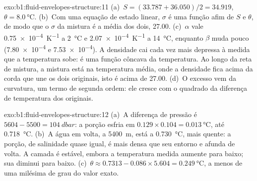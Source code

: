 \begin{solution}{exo:b1:fluid-envelopes-structure:11}
(a)~$S = (33.787 + 36.050)/2 = 34.919$, $\theta = \qty{8.0}{\celsius}$.
(b)~Com uma equação de estado linear, $\sigma$ é uma função afim de $S$ e
$\theta$, de modo que o $\sigma$ da mistura é a média dos dois, 27.00.
(c)~$\alpha$ vale \qty{0.75e-4}{K^{-1}} a \qty{2}{\celsius} e
\qty{2.07e-4}{K^{-1}} a \qty{14}{\celsius}, enquanto $\beta$ muda pouco
(\num{7.80e-4} e \num{7.53e-4}). A densidade cai cada vez mais depressa à medida que a
temperatura sobe: é uma função côncava da temperatura. Ao longo da reta de mistura,
a mistura está na temperatura média, onde a densidade fica acima da corda que une os dois
originais, isto é acima de 27.00. (d)~O excesso vem da curvatura, um termo de segunda ordem:
ele cresce com o quadrado da diferença de temperatura dos originais.
\end{solution}

\begin{solution}{exo:b1:fluid-envelopes-structure:12}
(a)~A diferença de pressão é $5604 - 5500 = \qty{104}{dbar}$: a porção esfria
em $0.129 \times 0.104 = \qty{0.013}{\celsius}$, até \qty{0.718}{\celsius}.
(b)~A água em volta, a \qty{5400}{m}, está a \qty{0.730}{\celsius}, mais quente: a
porção, de salinidade quase igual, é mais densa que seu entorno e afunda de volta. A
camada é estável, embora a temperatura medida aumente para baixo; sua  diminui para baixo. (c)~$\theta \approx
0.7313 - 0.086 \times 5.604 = \qty{0.249}{\celsius}$, a menos de uma milésima de grau do valor exato.
\end{solution}

